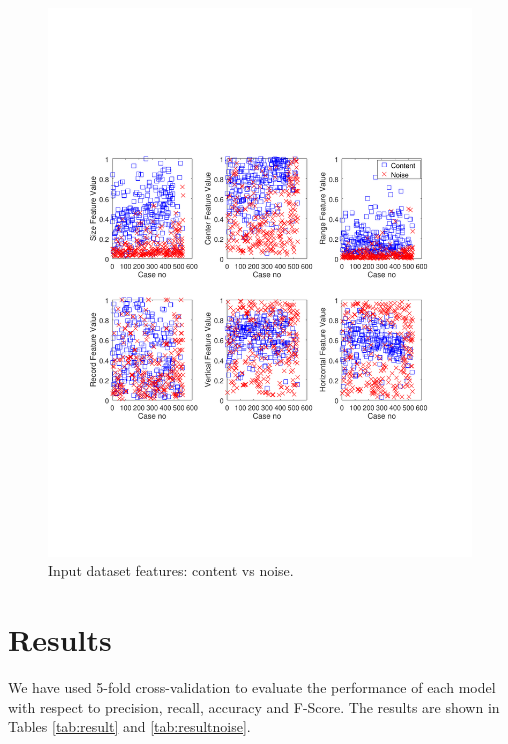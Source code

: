 \begin{figure}[h]
  \centering
     \includegraphics[trim={2.0cm 7.4cm 0.7cm 7.4cm}, clip,  width=\columnwidth]{img/dataset.pdf}
  \caption{Input dataset features: content vs noise.}
  \label{fig:dataset}
\end{figure}

\section{Results}
We have used 5-fold cross-validation to evaluate the performance of each model
with respect to precision, recall, accuracy and F-Score. The results are shown
in Tables \ref{tab:result} and \ref{tab:resultnoise}.

